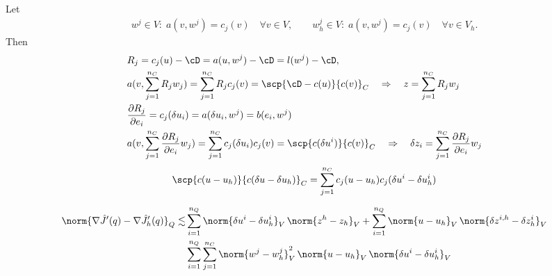 Let
%
\begin{align*}
w^j\in V:\; a(v,w^j) = c_j(v)\quad\forall v\in V,\qquad w_h^j\in V:\; a(v,w^j)= c_j(v)\quad\forall v\in V_h.
\end{align*}
%
Then
%
\begin{align*}
&R_j = c_j(u) - \cD = a(u,w^j) - \cD = l(w^j) - \cD,\\
&a(v, \sum_{j=1}^{n_C} R_j w_j) = \sum_{j=1}^{n_C} R_j c_j(v) = \scp{\cD-c(u)}{c(v)}_C\quad\Rightarrow\quad 
z = \sum_{j=1}^{n_C} R_j w_j\\
&\frac{\partial R_j}{\partial e_i} = c_j(\delta u_i) = a(\delta u_i,w^j) = b(e_i, w^j)\\
&a(v, \sum_{j=1}^{n_C}  \frac{\partial R_j}{\partial e_i}w_j) = \sum_{j=1}^{n_C}c_j(\delta u_i) c_j(v) = \scp{c(\delta u^i)}{c(v)}_C\quad\Rightarrow\quad \delta z_i = \sum_{j=1}^{n_C} \frac{\partial R_j}{\partial e_i} w_j
\end{align*}
%
%
\begin{align*}
\scp{c(u-u_h)}{c(\delta u-\delta u_h)}_C = \sum_{j=1}^{n_C} c_j(u-u_h)c_j(\delta u^i-\delta u^i_h)
\end{align*}
%

%
\begin{corollary}\label{cor:}
%
\begin{equation}\label{eq:}
\begin{split}
\norm{\nabla \hat J'(q)- \nabla\hat J_h'(q)}_Q \lesssim& \sum_{i=1}^{n_Q} \norm{\delta u^i-\delta u^i_h}_V\,\norm{z^h-z_h}_V +  \sum_{i=1}^{n_Q} \norm{u- u_h}_V\,\norm{\delta z^{i,h}-\delta z_h^i}_V\\
&  \sum_{i=1}^{n_Q}\sum_{j=1}^{n_C} \norm{w^j- w^j_h}^2_V\,\norm{u- u_h}_V\,\norm{\delta u^i-\delta u^i_h}_V
\end{split}
\end{equation}
%
\end{corollary}



%

